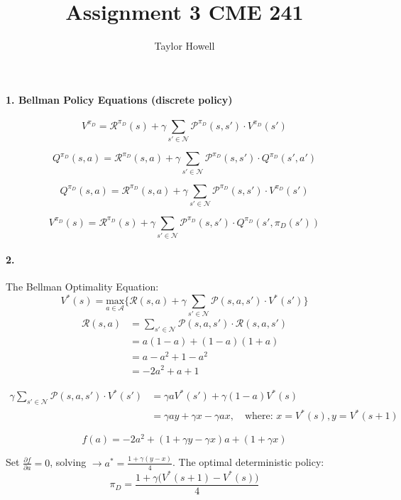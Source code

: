 \documentclass[12pt]{article}
\title{Assignment 3 CME 241}
\author{Taylor Howell}
\begin{document}
\maketitle

\paragraph{1. Bellman Policy Equations (discrete policy)}
$$V^{\pi_D} = \mathcal{R}^{\pi_D}(s) + \gamma \sum\limits_{s' \in \mathcal{N}} \mathcal{P}^{\pi_D}(s, s') \cdot V^{\pi_D}(s')$$

$$Q^{\pi_D}(s,a) = \mathcal{R}^{\pi_D}(s, a) + \gamma \sum\limits_{s' \in \mathcal{N}} \mathcal{P}^{\pi_D}(s, s') \cdot Q^{\pi_D}(s', a')$$

$$Q^{\pi_D}(s,a) = \mathcal{R}^{\pi_D}(s, a) + \gamma \sum\limits_{s' \in \mathcal{N}} \mathcal{P}^{\pi_D}(s, s') \cdot V^{\pi_D}(s')$$

$$V^{\pi_D}(s) = \mathcal{R}^{\pi_D}(s) + \gamma \sum\limits_{s' \in \mathcal{N}} \mathcal{P}^{\pi_D}(s, s') \cdot Q^{\pi_D}(s',\pi_D(s'))$$

\paragraph{2.}
The Bellman Optimality Equation:
$$ V^{*}(s) = \underset{a \in \mathcal{A}}{\mbox{max}} \{\mathcal{R}(s,a) + \gamma \sum\limits_{s' \in \mathcal{N}} \mathcal{P}(s,a,s') \cdot V^{*}(s')\}$$
\begin{align*}
	\mathcal{R}(s,a) &= \sum\limits_{s' \in \mathcal{N}} \mathcal{P}(s,a,s') \cdot \mathcal{R}(s,a,s') \\
	&= a (1 - a) + (1 - a) (1 + a)\\
	&= a - a^2 + 1 - a^2 \\
	&= -2 a^2 + a + 1
\end{align*}

\begin{align*}
	 \gamma \sum\limits_{s' \in \mathcal{N}} \mathcal{P}(s,a,s') \cdot V^{*}(s') &= \gamma a V^{*}(s') + \gamma (1 - a) V^{*}(s)\\
	 &= \gamma a y  + \gamma x - \gamma a x, \quad \mbox{where: } x = V^{*}(s), y = V^{*}(s+1)
\end{align*}

$$ f(a) = -2 a^2 + (1 + \gamma y - \gamma x) a + (1 + \gamma x)$$

Set $\frac{\partial f}{\partial a} = 0$, solving $\rightarrow a^{*} = \frac{1 + \gamma (y - x)}{4}$. The optimal deterministic policy:
$$\pi_D = \frac{1 + \gamma \Big(V^{*}(s+1) - V^{*}(s)\Big)}{4}$$
\end{document}
